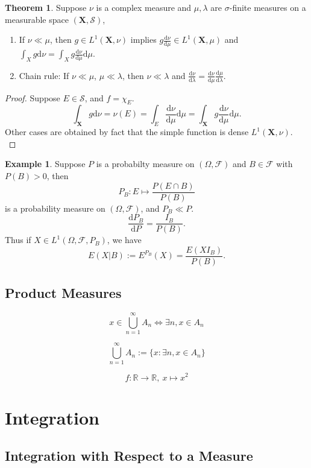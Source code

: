 \documentclass[12pt]{book}
\theoremstyle{definition}
\newtheorem{example}{Example}[chapter]
\newtheorem{theorem}{Theorem}[chapter]
\newcommand{\X}{\mathbf{X}}
\newcommand{\D}{\mathrm{d}}
\begin{document}
\begin{theorem}
Suppose $\nu$ is a complex measure and $\mu,\lambda$ are $\sigma$-finite measures on a measurable space $(\X,\mathcal S)$, 
\begin{enumerate}
	\item If $\nu \ll \mu$, then $g \in L^1(\X,\nu)$ implies $g\frac{\D \nu}{\D \mu}\in L^1(\X,\mu)$	 and $\int_X g \D \nu=\int_X g\frac{\D \nu}{\D \mu} \D\mu$.
	\item Chain rule: If $\nu \ll \mu$, $\mu \ll \lambda$, then $\nu \ll \lambda$ and 
	$\frac{\D \nu}{\D \lambda} = \frac{\D \nu}{\D \mu}\frac{\D \mu}{
	\D \lambda}$.
\end{enumerate}	
\end{theorem}
\begin{proof}
Suppose $E\in \mathcal S$, and $f=\chi_E$.
$$
\int_\X g\D \nu =\nu(E) = \int_E \frac{\D \nu}{\D \mu}\D \mu = \int_\X g \frac{\D\nu}{\D \mu} \D \mu.
$$
Other cases are obtained by fact that the simple function is dense $L^1(\X,\nu)$. \\
\end{proof}








\begin{example}
Suppose $P$ is a probabilty measure on $(\Omega,\mathcal F)$ and $B\in \mathcal F$ with $P(B)>0$, then 
$$
P_B: E \mapsto \frac{P(E\cap B)}{P(B)}
$$ 
is a probability measure on $(\Omega,\mathcal F)$, and $P_B \ll P$.
$$
\frac{\D P_B}{\D P} = \frac{I_B}{P(B)}.
$$ 
Thus if $X \in L^1(\Omega,\mathcal F,P_B)$, we have 
$$
E(X|B) := E^{P_B}(X) = \frac{E(XI_B)}{P(B)}.
$$

\end{example}

\section{Product Measures}
$$
x \in \bigcup_{n=1}^{\infty} A_n \iff \exists n,x \in A_n
$$

$$
\bigcup_{n=1}^{\infty}A_n := \{ x: \exists n, x \in A_n  \}
$$


$$
f: \mathbb{R} \to \mathbb{R}, \ x \mapsto x^2 
$$
\chapter{Integration}
\section{Integration with Respect to a Measure}
\end{document}
